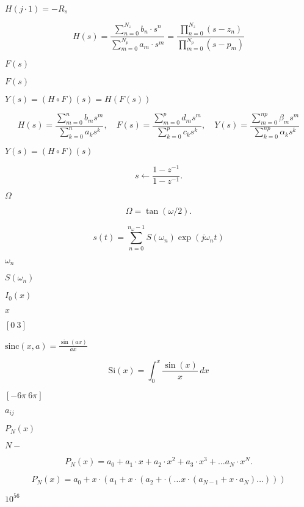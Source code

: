\documentclass{article}
\begin{document}
$H(j\cdot 1) = -R_s$
\pagebreak

\[ H(s) = \frac{\sum_{n = 0}^{N_z} b_n \cdot s^n}{\sum_{m = 0}^{N_p} a_m \cdot s^m} = \frac{\prod_{n = 0}^{N_z}(s-z_n)}{\prod_{m = 0}^{N_p} (s-p_m)} \]
\pagebreak

$ F(s) $
\pagebreak

$F(s)$
\pagebreak

$Y(s) = (H \circ F)(s) = H(F(s))$
\pagebreak

\[ H(s) = \frac{\sum\limits_{m = 0}^{n} b_m s^m}{\sum\limits_{k = 0}^{n} a_k s^k}, \quad F(s) = \frac{\sum\limits_{m = 0}^{p} d_m s^m}{\sum\limits_{k = 0}^{p} c_k s^k}, \quad Y(s) = \frac{\sum\limits_{m = 0}^{n p} \beta_m s^m}{\sum\limits_{k = 0}^{n p} \alpha_k s^k} \]
\pagebreak

$Y(s) = (H \circ F)(s)$
\pagebreak

\[ s \leftarrow \frac{1 - z^{-1}}{1 - z^{-1}}. \]
\pagebreak

$\Omega$
\pagebreak

\[ \Omega = \tan(\omega / 2). \]
\pagebreak

\[ s(t) = \sum\limits_{n = 0}^{n_{\omega}-1} S(\omega_n) \exp(j\omega_n t) \]
\pagebreak

$\omega_n$
\pagebreak

$S(\omega_n)$
\pagebreak

$ I_0(x)$
\pagebreak

$ x $
\pagebreak

$[0 \ 3]$
\pagebreak

$ \textrm{sinc}(x,a) = \frac{\sin(ax)}{ax}$
\pagebreak

\[ \textrm{Si}(x) = \int_{0}^{x} \frac{\sin(x)}{x} \, dx\]
\pagebreak

$[-6\pi \ 6\pi]$
\pagebreak

$a_{ij}$
\pagebreak

$P_N(x)$
\pagebreak

$N-$
\pagebreak

\[ P_N(x) = a_0 + a_1 \cdot x + a_2 \cdot x^2 + a_3 \cdot x^3 + ... a_N \cdot x^N. \]
\pagebreak

\[ P_N(x) = a_0 + x \cdot (a_1 + x \cdot (a_2 + \cdot ( \ldots x \cdot (a_{N-1} + x\cdot a_N) \ldots ))) \]
\pagebreak

$10^{56}$
\pagebreak
\end{document}
